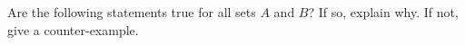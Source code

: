 \documentclass[11pt]{exam}
\def\pow{\mathcal{P}}
\begin{document}
\begin{questions}
\begin{multicols}{3}
\end{multicols}

\vfill

\question Are the following statements true for all sets $A$ and $B$?  If so, explain why.  If not, give a counter-example.


\end{questions}
\end{document}
